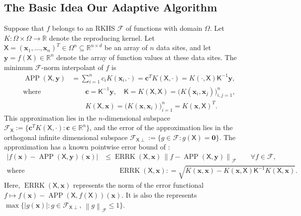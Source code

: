 \documentclass[]{mcom-l}
\theoremstyle{remark}
\DeclareMathOperator{\errK}{ERRK}
\DeclareMathOperator{\APP}{APP}
\newcommand{\reals}{{\mathbb{R}}}
\newcommand{\mK}{\mathsf{K}}
\newcommand{\mX}{\mathsf{X}}
\newcommand{\bzero}{\boldsymbol{0}}
\newcommand{\bc}{{\boldsymbol{c}}}
\newcommand{\bx}{{\boldsymbol{x}}}
\newcommand{\by}{{\boldsymbol{y}}}
\newcommand{\cx}{{\Omega}}
\newcommand{\calf}{{\mathcal{F}}}
\def\abs#1{\ensuremath{\left \lvert #1 \right \rvert}}
\newcommand{\norm}[2][{}]{\ensuremath{\left \lVert #2 \right \rVert}_{#1}}
\newcommand{\bignorm}[2][{}]{\ensuremath{\bigl \lVert #2 \bigr \rVert}_{#1}}
\begin{document}
\subsection{The Basic Idea Our Adaptive Algorithm} \label{sec:basicIdea}
Suppose that $f$ belongs to an RKHS $\calf$ of functions with domain $\cx$.  Let $K: \Omega \times \Omega \to \reals$ denote the reproducing kernel.  Let $\mX = (\bx_1, \ldots, \bx_n)^T \in \cx^n \subseteq \reals^{n \times d}$ be an array of $n$ data sites, and let $\by  = f(\mX) \in \reals^n$ denote the array of function values at these data sites.  
The minimum $\calf$-norm interpolant of $f$ is 
\begin{subequations} \label{eq:RKHSAPP}
\begin{align} 
\APP(\mX,\by) &= \sum_{i=1}^n c_i K(\bx_i,\cdot) = \bc^T K(\mX,\cdot) =  K(\cdot, \mX) \mK^{-1} \by, \\
 \text{where } & \qquad \bc = \mK^{-1} \by, \quad \mK = K(\mX,\mX) = \bigl( K(\bx_i,\bx_j) \bigr)_{i,j=1}^n,  \\
& \qquad  K(\mX,\bx) = \bigl(K(\bx,\bx_i) \bigr)_{i=1}^n =  K(\bx, \mX)^T.
\end{align}
\end{subequations}
This approximation lies in the $n$-dimensional subspace $\calf_{\mX} := \{\bc^T K(\mX,\cdot) : \bc \in \reals^n \}$, and the error of the approximation lies in the orthogonal infinite dimensional subspace $\calf_{\mX \perp} := \{g \in \calf : g(\mX) = \bzero\}$.
The approximation has a known pointwise error bound of \cite{bibid}:
\begin{subequations} \label{eq:RKHSErrBd}
\begin{align}
\abs{f(\bx) - \APP(\mX,\by)(\bx)} & \le  \errK(\mX,\bx) \, \bignorm[\calf]{f - \APP(\mX,\by)}  \qquad \forall f \in \calf,  \\
\text{where} & \qquad\errK(\mX,\bx) : = \sqrt{K(\bx,\bx) - K(\bx,\mX) \mK^{-1} K(\mX,\bx)}.
\end{align}
\end{subequations}
Here, $\errK(\mX,\bx)$ represents the norm of the error functional $f \mapsto f(\bx)-\APP(\mX,f(\mX))(\bx)$.  It is also the represents $\max \{\abs{g(\bx)} : g \in \calf_{\mX \perp}, \ \norm[\calf]{g} \le 1\}$.
\end{document}
